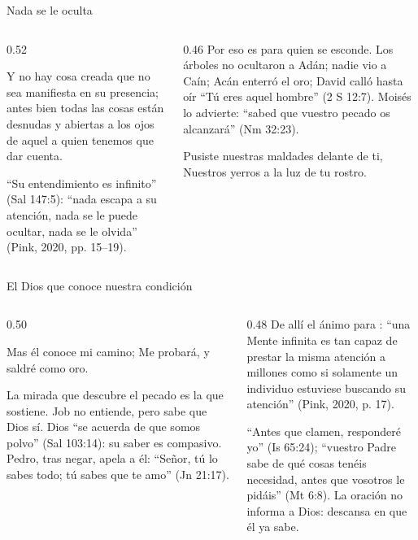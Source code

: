 \begin{frame}{Nada se le oculta}
\begin{columns}[t,onlytextwidth]
\begin{column}{0.52\textwidth}
\begin{cita}[fontupper=\scriptsize\itshape]Y no hay cosa creada que no sea manifiesta en su presencia; antes bien todas las cosas están desnudas y abiertas a los ojos de aquel a quien tenemos que dar cuenta.\end{cita}
\scriptsize ``Su entendimiento es infinito'' (Sal 147:5): ``nada escapa a su atención, nada se le puede ocultar, nada se le olvida'' (Pink, 2020, pp. 15--19).
\end{column}
\begin{column}{0.46\textwidth}\scriptsize
Por eso es  para quien se esconde. Los árboles no ocultaron a Adán; nadie vio a Caín; Acán enterró el oro; David calló hasta oír ``Tú eres aquel hombre'' (2 S 12:7). Moisés lo advierte: ``sabed que vuestro pecado os alcanzará'' (Nm 32:23).
\begin{cita}[fontupper=\scriptsize\itshape]Pusiste nuestras maldades delante de ti, Nuestros yerros a la luz de tu rostro.\end{cita}
\end{column}
\end{columns}
\end{frame}

\begin{frame}{El Dios que conoce nuestra condición}
\begin{columns}[t,onlytextwidth]
\begin{column}{0.50\textwidth}
\begin{cita}[fontupper=\scriptsize\itshape]Mas él conoce mi camino; Me probará, y saldré como oro.\end{cita}
\scriptsize La mirada que descubre el pecado es la que sostiene. Job no entiende, pero sabe que Dios sí. Dios ``se acuerda de que somos polvo'' (Sal 103:14): su saber es compasivo. Pedro, tras negar, apela a él: ``Señor, tú lo sabes todo; tú sabes que te amo'' (Jn 21:17).
\end{column}
\begin{column}{0.48\textwidth}\scriptsize
De allí el ánimo para : ``una Mente infinita es tan capaz de prestar la misma atención a millones como si solamente un individuo estuviese buscando su atención'' (Pink, 2020, p. 17).\par\medskip
``Antes que clamen, responderé yo'' (Is 65:24); ``vuestro Padre sabe de qué cosas tenéis necesidad, antes que vosotros le pidáis'' (Mt 6:8). La oración no informa a Dios: descansa en que él ya sabe.
\end{column}
\end{columns}
\end{frame}

